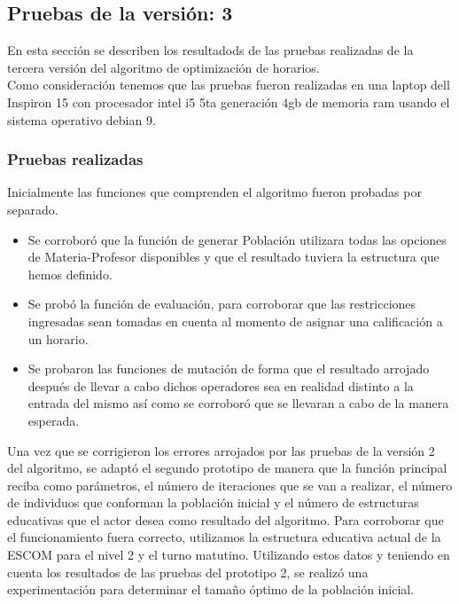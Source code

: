 \subsection{Pruebas de la versión: 3} \label{chp:pruebasV3}
En esta sección se describen los resultadods de las pruebas realizadas de la tercera versión del algoritmo de optimización de horarios.\\

Como consideración tenemos que las pruebas fueron realizadas en una laptop dell Inspiron 15 con procesador intel i5 5ta generación 4gb de memoria ram usando el sistema operativo debian 9.\\


\subsubsection{Pruebas realizadas}

Inicialmente las funciones que comprenden el algoritmo fueron probadas por separado. \\

\begin{itemize}
	\item Se corroboró que la función de generar Población utilizara todas las opciones de Materia-Profesor disponibles y que el resultado tuviera la estructura que hemos definido. 
	
	\item Se probó la función de evaluación, para corroborar que las restricciones ingresadas sean tomadas en cuenta al momento de asignar una calificación a un horario.
	
	\item Se probaron las funciones de mutación de forma que el resultado arrojado después de llevar a cabo dichos operadores sea en realidad distinto a la entrada del mismo así como se corroboró que se llevaran a cabo de la manera esperada.
	
\end{itemize}

Una vez que se corrigieron los errores arrojados por las pruebas de la versión 2 del algoritmo, se adaptó el segundo prototipo de manera que la función principal reciba como parámetros, el número de iteraciones que se van a realizar, el número de individuos que conforman la población inicial y el número de estructuras educativas que el actor desea como resultado del algoritmo. Para corroborar que el funcionamiento fuera correcto, utilizamos la estructura educativa actual de la ESCOM para el nivel 2 y el turno matutino. Utilizando estos datos y teniendo en cuenta los resultados de las pruebas del prototipo 2, se realizó una experimentación para determinar el tamaño óptimo de la población inicial.\\

